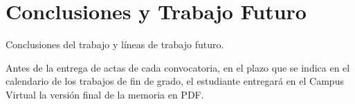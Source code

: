 \chapter{Conclusiones y Trabajo Futuro}
\label{cap:conclusiones}

\cite{BibTexOriginal}

Conclusiones del trabajo y líneas de trabajo futuro.

Antes de la entrega de actas de cada convocatoria, en el plazo que se indica en el calendario de los trabajos de fin de grado, el estudiante entregará en el Campus Virtual la versión final de la memoria en PDF.


